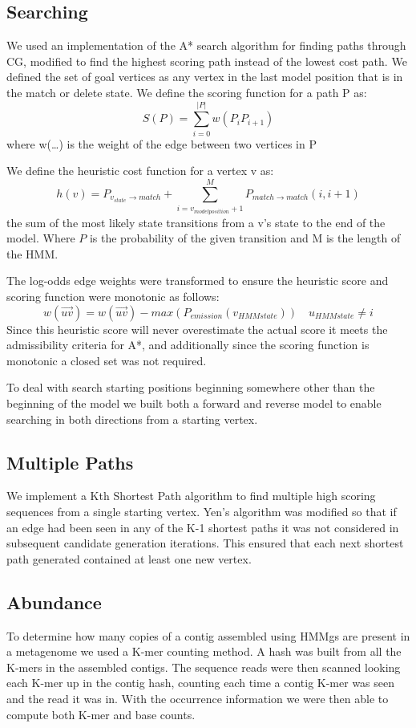 \documentclass[10pt]{bmc_article}
\newenvironment{bmcformat}{\begin{raggedright}\baselineskip20pt\sloppy\setboolean{publ}{false}}{\end{raggedright}\baselineskip20pt\sloppy}
\begin{document}
\begin{bmcformat}
\subsection*{Searching}
We used an implementation of the A* search algorithm\cite{Hart1968} for finding paths through CG, modified to find the highest scoring
path instead of the lowest cost path. We defined the set of goal vertices as any vertex in the last model position that is in the 
match or delete state.  We define the scoring function for a path P as: \[S(P) = \sum_{i=0}^{|P|}w(P_iP_{i+1})\] 
where w(\ldots) is the weight of the edge between two vertices in P

We define the heuristic cost function for a vertex v as:
\[h(v) = P_{v_{state}\rightarrow match} + \sum_{i=v_{model position} + 1}^{M}P_{match\rightarrow match}(i, i + 1)\]
the sum of the most likely state transitions from a v's state to the end of the model. Where $P$ is the probability of the given transition and M is the length of the HMM.

The log-odds edge weights were transformed to ensure the heuristic score and scoring function were monotonic as follows:
\[ w(\overrightarrow{uv}) = w(\overrightarrow{uv}) - max(P_{emission}(v_{HMM state})) \quad u_{HMM state} \ne i\]
Since this heuristic score will never overestimate the actual score it meets the admissibility criteria for A*, and additionally since the scoring function is monotonic a closed set was not required.

To deal with search starting positions beginning somewhere other than the beginning of the model we built both a forward and reverse model to enable searching in both directions from a starting vertex.

\subsection*{Multiple Paths}

We implement a Kth Shortest Path algorithm\cite{Yen1971}\cite{Lawler1972} to find multiple high scoring sequences from a single starting vertex.  Yen's algorithm was modified so that if an edge had been seen in any of the K-1 shortest paths it was not considered in subsequent candidate generation iterations.  This ensured that each next shortest path generated contained at least one new vertex.

\subsection*{Abundance}
To determine how many copies of a contig assembled using HMMgs are present in a metagenome we used a K-mer counting method.  A hash was built from all the K-mers in the assembled contigs. The sequence reads were then scanned looking each K-mer up in the contig hash, counting each time a contig K-mer was seen and the read it was in. With the occurrence information we were then able to compute both K-mer and base counts.


\end{bmcformat}
\end{document}
